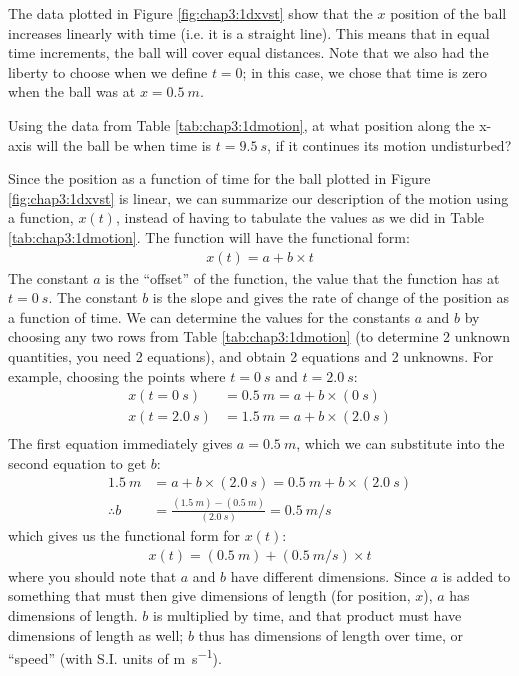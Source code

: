 The data plotted in Figure \ref{fig:chap3:1dxvst} show that the $x$ position of the ball increases linearly with time (i.e. it is a straight line). This means that in equal time increments, the ball will cover equal distances. Note that we also had the liberty to choose when we define $t=0$; in this case, we chose that time is zero when the ball was at $x=\SI{0.5}{m}$. 

\begin{checkpointSA}{Using the data from Table \ref{tab:chap3:1dmotion}, at what position along the x-axis will the ball be when time is $t=\SI{9.5}{s}$, if it continues its motion undisturbed?} %
\end{checkpointSA} 

Since the position as a function of time for the ball plotted in Figure \ref{fig:chap3:1dxvst} is linear, we can summarize our description of the motion using a function, $x(t)$, instead of having to tabulate the values as we did in Table \ref{tab:chap3:1dmotion}. The function will have the functional form:
\begin{align*}
x(t) = a + b\times t
\end{align*}
The constant $a$ is the ``offset'' of the function, the value that the function has at $t=\SI{0}{s}$. The constant $b$ is the slope and gives the rate of change of the position as a function of time. We can determine the values for the constants $a$ and $b$ by choosing any two rows from Table \ref{tab:chap3:1dmotion} (to determine 2 unknown quantities, you need 2 equations), and obtain 2 equations and 2 unknowns. For example, choosing the points where $t=\SI{0}{s}$ and $t=\SI{2.0}{s}$:
\begin{align*}
x(t=\SI{0}{s})&=\SI{0.5}{m}=a + b\times(\SI{0}{s}) \\
x(t=\SI{2.0}{s})&=\SI{1.5}{m}=a + b\times(\SI{2.0}{s}) \\
\end{align*}
The first equation immediately gives $a = \SI{0.5}{m}$, which we can substitute into the second equation to get $b$:
\begin{align*}
\SI{1.5}{m}&=a + b\times(\SI{2.0}{s}) = \SI{0.5}{m} + b\times(\SI{2.0}{s})\\
\therefore b &=\frac{(\SI{1.5}{m})-(\SI{0.5}{m})}{(\SI{2.0}{s})}=\SI{0.5}{m\per s}
\end{align*}
which gives us the functional form for $x(t)$:
\begin{align*}
x(t) = (\SI{0.5}{m}) + (\SI{0.5}{m\per s})\times t
\end{align*}
where you should note that $a$ and $b$ have different dimensions. Since $a$ is added to something that must then give dimensions of length (for position, $x$), $a$ has dimensions of length. $b$ is multiplied by time, and that product must have dimensions of length as well; $b$ thus has dimensions of length over time, or ``speed'' (with S.I. units of \si{m\per s}).

